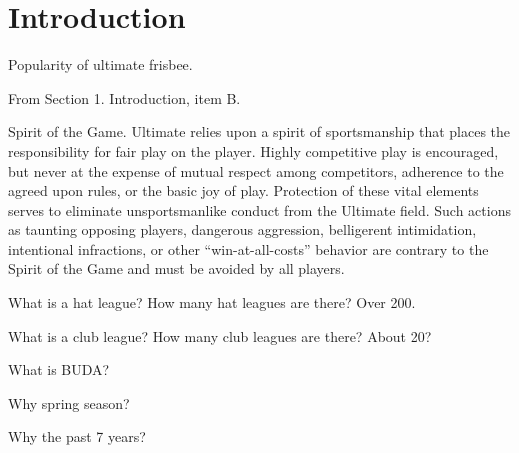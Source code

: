 \section{Introduction}

Popularity of ultimate frisbee.

From Section 1. Introduction, item B. 

\quote Spirit of the Game. Ultimate relies upon a spirit of sportsmanship that places the responsibility for fair play on the player. Highly competitive play is encouraged, but never at the expense of mutual respect among competitors, adherence to the agreed upon rules, or the basic joy of play. Protection of these vital elements serves to eliminate unsportsmanlike conduct from the Ultimate field. Such actions as taunting opposing players, dangerous aggression, belligerent intimidation, intentional infractions, or other ``win-at-all-costs'' behavior are contrary to the Spirit of the Game and must be avoided by all players.

What is a hat league?  How many hat leagues are there? Over 200.

What is a club league?  How many club leagues are there? About 20?

What is BUDA?

Why spring season?

Why the past 7 years?